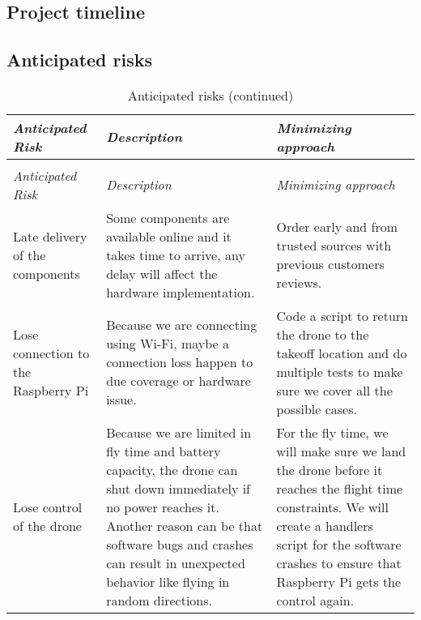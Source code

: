 \documentclass[../main.tex]{subfiles}
\begin{document}
\subsection{Project timeline}



\subsection{Anticipated risks}

\begin{center}
    \begin{xltabular}{\textwidth}{ X X X }
        \caption{Anticipated risks.}
        \label{tab:risks} \\
        \toprule
        \textit{Anticipated Risk} 
        & \textit{Description} 
        & \textit{Minimizing approach} \\
        \midrule
        \endfirsthead

        \caption[]{Anticipated risks (continued)} \\
        \toprule
        \textit{Anticipated Risk} 
        & \textit{Description} 
        & \textit{Minimizing approach} \\
        \midrule
        \endhead

        Late delivery of the components 
        & Some components are available online 
        and it takes time to arrive, 
        any delay will affect the hardware implementation.
        & Order early and from trusted sources with previous 
        customers reviews. \\
        
        Lose connection to the Raspberry Pi
        & Because we are connecting using Wi-Fi, 
        maybe a connection loss 
        happen to due coverage or hardware issue.
        & Code a script to return the drone 
        to the takeoff location 
        and do multiple tests to make sure 
        we cover all the possible cases. \\
        
        Lose control of the drone
        & Because we are limited in fly time 
        and battery capacity, 
        the drone can shut down immediately if 
        no power reaches it.
        Another reason can be that software bugs 
        and crashes can 
        result in unexpected behavior like flying 
        in random directions.
        & For the fly time, we will make sure 
        we land the drone before it reaches 
        the flight time constraints.
        We will create a handlers script 
        for the software crashes 
        to ensure that Raspberry Pi gets the 
        control again.  \\
        

\end{xltabular}
\end{center}
\end{document}
